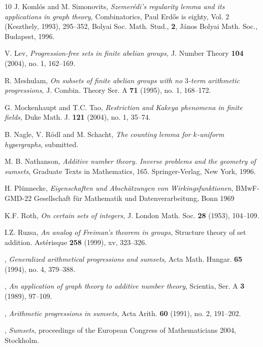 \documentclass[12pt,a4paper,reqno]{amsart}
\numberwithin{equation}{section}
\theoremstyle{plain}
\theoremstyle{definition}
\begin{document}
\begin{thebibliography}{10}
 J. Koml\'os and M. Simonovits,
\emph{Szemer\'edi's regularity lemma and its applications in graph theory,}
Combinatorics, Paul Erd\H{o}s is eighty, Vol. 2 (Keszthely, 1993), 295--352, 
Bolyai Soc. Math. Stud., \textbf{2}, 
J\'anos Bolyai Math. Soc., Budapest, 1996. 

 V. Lev, \emph{Progression-free sets in finite abelian groups,} 
J. Number Theory \textbf{104} (2004), no. 1, 162--169.


 R. Meshulam, \emph{On subsets of finite abelian groups with no $3$-term arithmetic progressions,}
J. Combin. Theory Ser. A \textbf{71} (1995), no. 1, 168--172.

 G. Mockenhaupt and T.C. Tao, \emph{Restriction and Kakeya phenomena in finite fields,} 
Duke Math. J. \textbf{121} (2004), no. 1, 35--74.

 B. Nagle, V. R\"odl and M. Schacht, \emph{The counting lemma for $k$-uniform hypergraphs,} submitted.

 M. B. Nathanson, \emph{Additive number theory. Inverse 
problems and the geometry of sumsets}, Graduate Texts in Mathematics, 165. 
Springer-Verlag, New York, 1996.  

 H. Pl\"unnecke, \emph{Eigenschaften und Absch\"atzungen von 
Wirkingsfunktionen},  BMwF-GMD-22 Gesellschaft f\"ur Mathematik und 
Datenverarbeitung, Bonn 1969

 K.F. Roth, \emph{On certain sets of integers,} J. London Math. Soc. \textbf{28} (1953), 104--109.

 I.Z. Ruzsa,  \emph{An analog of Freiman's theorem in groups,}
Structure theory of set addition. 
Ast\'erisque \textbf{258} (1999), xv, 323--326.

 \bysame, \emph{Generalized arithmetical progressions and 
sumsets}, Acta Math. Hungar. \textbf{65} (1994), no. 4, 379--388.

 \bysame, \emph{An application of graph theory to additive 
number theory}, Scientia, Ser. A \textbf{3} (1989), 97--109.

 \bysame, \emph{Arithmetic progressions in sumsets,} Acta Arith. \textbf{60} (1991), no. 2, 191--202. 

  \bysame, \emph{Sumsets,} proceedings of the European Congress of Mathematicians 2004, Stockholm.


\end{thebibliography}
\end{document}
